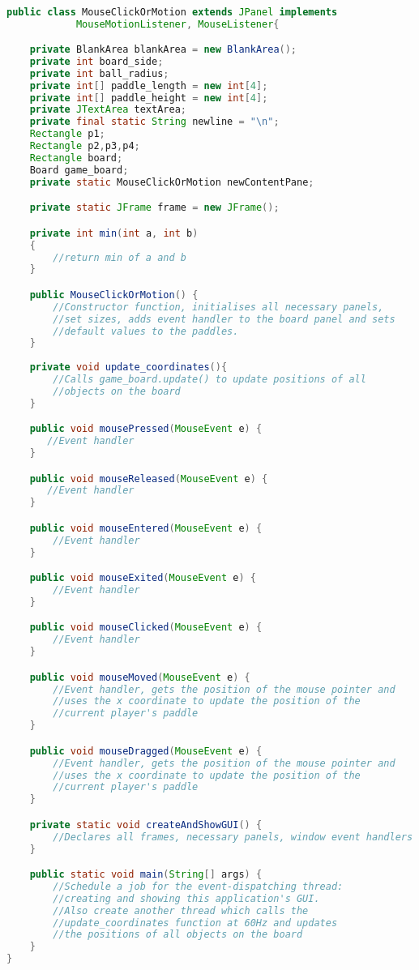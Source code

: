 \documentclass{article}
\begin{document}
\begin{lstlisting}[language=Java, caption={Class Parameters for MouseClickOrMotion}]

public class MouseClickOrMotion extends JPanel implements 
            MouseMotionListener, MouseListener{

	private BlankArea blankArea = new BlankArea();
    private int board_side;
    private int ball_radius;
    private int[] paddle_length = new int[4];
    private int[] paddle_height = new int[4];
    private JTextArea textArea;
    private final static String newline = "\n";
    Rectangle p1;
    Rectangle p2,p3,p4;
    Rectangle board;
    Board game_board;
    private static MouseClickOrMotion newContentPane;

    private static JFrame frame = new JFrame();

    private int min(int a, int b)
    {
    	//return min of a and b   
    }

    public MouseClickOrMotion() {
        //Constructor function, initialises all necessary panels, 
        //set sizes, adds event handler to the board panel and sets 
        //default values to the paddles.
    }
    
    private void update_coordinates(){
        //Calls game_board.update() to update positions of all 
        //objects on the board
    }

	public void mousePressed(MouseEvent e) {
       //Event handler
    }

    public void mouseReleased(MouseEvent e) {
       //Event handler
    }

    public void mouseEntered(MouseEvent e) {
    	//Event handler
    }

    public void mouseExited(MouseEvent e) {
		//Event handler
    }

    public void mouseClicked(MouseEvent e) {
        //Event handler
    }

    public void mouseMoved(MouseEvent e) {
        //Event handler, gets the position of the mouse pointer and 
        //uses the x coordinate to update the position of the 
        //current player's paddle
    }

    public void mouseDragged(MouseEvent e) {
        //Event handler, gets the position of the mouse pointer and 
        //uses the x coordinate to update the position of the 
        //current player's paddle
    }

    private static void createAndShowGUI() {
        //Declares all frames, necessary panels, window event handlers
    }

    public static void main(String[] args) {
        //Schedule a job for the event-dispatching thread:
        //creating and showing this application's GUI.
        //Also create another thread which calls the 
        //update_coordinates function at 60Hz and updates
        //the positions of all objects on the board
    }
}
\end{lstlisting}
\end{document}
